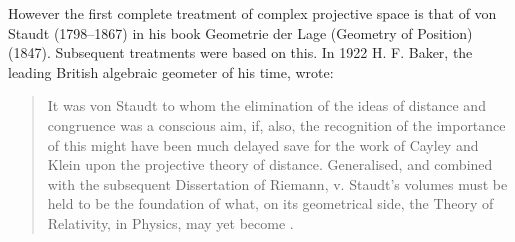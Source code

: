 However the first complete treatment of complex projective space is that of  von Staudt (1798--1867) in
his book Geometrie der Lage (Geometry of Position) (1847). Subsequent treatments were based on this. In 1922 H. F. Baker, the leading British algebraic geometer of his time, wrote: 
\begin{quotation}
 It was von Staudt to whom the elimination of the ideas of distance and congruence was a conscious aim, if, also, the recognition of the importance of this might have been much delayed save for the work of Cayley and Klein upon the projective theory of distance. Generalised, and combined with the subsequent Dissertation of Riemann, v. Staudt's volumes must be held to be the foundation of what, on its geometrical side, the Theory of Relativity, in Physics, may yet become \cite[p. 176]{MR2849917}.
\end{quotation}
